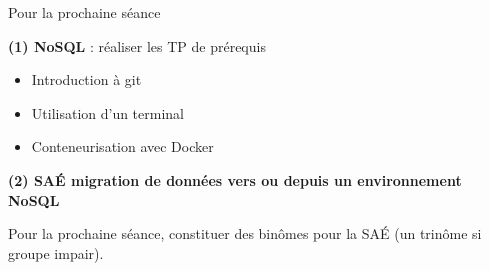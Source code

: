 \begin{frame}{Pour la prochaine séance}

    \textbf{(1) NoSQL} : réaliser les TP de prérequis

    \begin{itemize}
        \item Introduction à git
        \item Utilisation d'un terminal
        \item Conteneurisation avec Docker
    \end{itemize}

    \vspace{1cm}

    \textbf{(2) SAÉ migration de données vers ou depuis un environnement NoSQL}

    Pour la prochaine séance, constituer des binômes pour la SAÉ (un trinôme si groupe impair).

\end{frame}
